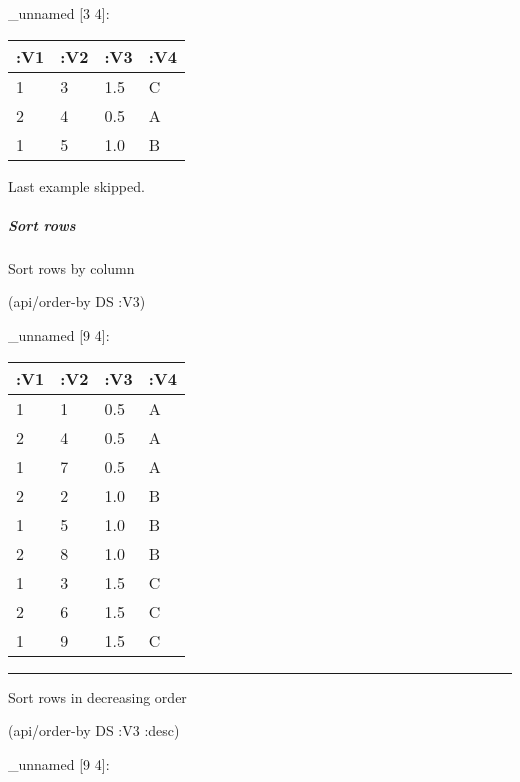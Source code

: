 \documentclass[]{article}
\newenvironment{Shaded}{\begin{snugshade}}{\end{snugshade}}
\newcommand{\AttributeTok}[1]{\textcolor[rgb]{0.77,0.63,0.00}{#1}}
\newcommand{\DecValTok}[1]{\textcolor[rgb]{0.00,0.00,0.81}{#1}}
\newcommand{\KeywordTok}[1]{\textcolor[rgb]{0.13,0.29,0.53}{\textbf{#1}}}
\newcommand{\NormalTok}[1]{#1}
\newcommand{\VariableTok}[1]{\textcolor[rgb]{0.00,0.00,0.00}{#1}}
\let\oldsubparagraph\subparagraph
\renewcommand{\subparagraph}[1]{\oldsubparagraph{#1}\mbox{}}
\begin{document}
\begin{Shaded}
\end{Shaded}

\_unnamed {[}3 4{]}:

\begin{longtable}[]{@{}llll@{}}
\toprule
:V1 & :V2 & :V3 & :V4\tabularnewline
\midrule
\endhead
1 & 3 & 1.5 & C\tabularnewline
2 & 4 & 0.5 & A\tabularnewline
1 & 5 & 1.0 & B\tabularnewline
\bottomrule
\end{longtable}

Last example skipped.

\hypertarget{sort-rows}{%
\subparagraph{Sort rows}\label{sort-rows}}

Sort rows by column

\begin{Shaded}
\begin{Highlighting}[]
\NormalTok{(api/order-by DS }\AttributeTok{:V3}\NormalTok{)}
\end{Highlighting}
\end{Shaded}

\_unnamed {[}9 4{]}:

\begin{longtable}[]{@{}llll@{}}
\toprule
:V1 & :V2 & :V3 & :V4\tabularnewline
\midrule
\endhead
1 & 1 & 0.5 & A\tabularnewline
2 & 4 & 0.5 & A\tabularnewline
1 & 7 & 0.5 & A\tabularnewline
2 & 2 & 1.0 & B\tabularnewline
1 & 5 & 1.0 & B\tabularnewline
2 & 8 & 1.0 & B\tabularnewline
1 & 3 & 1.5 & C\tabularnewline
2 & 6 & 1.5 & C\tabularnewline
1 & 9 & 1.5 & C\tabularnewline
\bottomrule
\end{longtable}

\begin{center}\rule{0.5\linewidth}{0.5pt}\end{center}

Sort rows in decreasing order

\begin{Shaded}
\begin{Highlighting}[]
\NormalTok{(api/order-by DS }\AttributeTok{:V3} \AttributeTok{:desc}\NormalTok{)}
\end{Highlighting}
\end{Shaded}

\_unnamed {[}9 4{]}:
\end{document}

